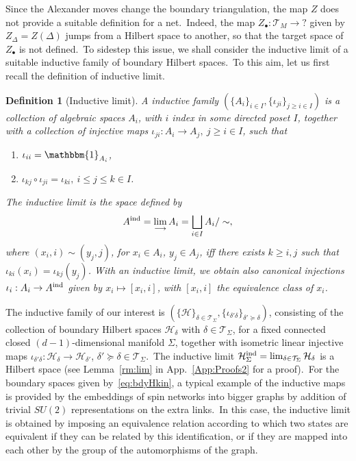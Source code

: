 \documentclass[11pt]{article}
\newcommand{\Hil}{\mathcal{H}}
\newcommand{\h}{\mathcal{H}}
\newtheorem{definition}{Definition}[section]
\theoremstyle{definition}
\numberwithin{equation}{section}
\begin{document}
Since the Alexander moves change the boundary triangulation, the map $Z$ does not provide a suitable definition for a net.~Indeed, the map $Z_{\bullet}:\mathcal{T}_M\to ?$ given by $Z_\Delta=Z(\Delta)$ jumps from a Hilbert space to another, so that the target space of $Z_{\bullet}$ is not defined.~To sidestep this issue, we shall consider the inductive limit of a suitable inductive family of boundary Hilbert spaces.~To this aim, let us first recall the definition of inductive limit. 
\begin{definition}[Inductive limit]\label{def:inductive}
    A inductive family $(\{A_i\}_{i\in I},\{\iota_{ji}\}_{j\geq i\in I})$ is a collection of algebraic spaces $A_i$, with $i$ index in some directed poset $I$, together with a collection of injective maps $\iota_{ji}:A_i\to A_j,\ j\geq i\in I$, such that
    \begin{enumerate}
        \item $\iota_{ii}=\mathbbm{1}_{A_i}$,
        \item $\iota_{kj}\circ\iota_{ji}=\iota_{ki},\ i\leq j\leq k\in I$.
    \end{enumerate}
    The inductive limit is the space defined by
    \[A^{\rm ind}=\lim_{\longrightarrow}A_i=\bigsqcup_{i\in I}A_i/\sim,\]
    where $(x_i,i)\sim (y_j,j)$, for $x_i\in A_i$, $y_j\in A_j$, iff there exists $k\geq i,j$ such that $\iota_{ki}(x_{i})=\iota_{kj}(y_{j})$. With an inductive limit, we obtain also canonical injections $\iota_i:A_i\to A^{\rm ind}$ given by $x_i\mapsto [x_i,i]$, with $[x_i,i]$ the equivalence class of $x_i$.
\end{definition}
The inductive family of our interest is $(\{\mathcal H\}_{\delta\in\mathcal T_{\Sigma}},\{\iota_{\delta'\delta}\}_{\delta'\succeq\delta})$, consisting of the collection of boundary Hilbert spaces $\Hil_\delta$ with $\delta\in\mathcal{T}_{\Sigma}$, for a fixed connected closed $(d-1)$-dimensional manifold $\Sigma$, together with isometric linear injective maps $\iota_{\delta'\delta}:\Hil_{\delta}\to\Hil_{\delta'}$, $\delta'\succeq\delta\in\mathcal{T}_{\Sigma}$.~The inductive limit $\h_{\Sigma}^{\rm ind}=\lim_{\delta\in\mathcal{T}_{\Sigma}}\h_{\delta}$ is a Hilbert space (see Lemma~\ref{rm:lim} in App.~\ref{App:Proofs2} for a proof).~For the boundary spaces given by~\eqref{eq:bdyHkin}, a typical example of the inductive maps is provided by the embeddings of spin networks into bigger graphs by addition of trivial $SU(2)$ representations on the extra links.~In this case, the inductive limit is obtained by imposing an equivalence relation according to which two states are equivalent if they can be related by this identification, or if they are mapped into each other by the group of the automorphisms of the graph.
\end{document}
